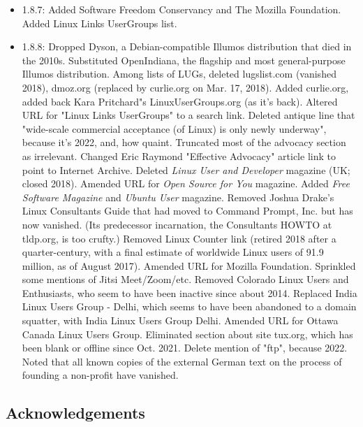 \begin{itemize}
\item 1.8.7:  Added Software Freedom Conservancy and The Mozilla
Foundation.  Added Linux Links UserGroups list.
\item 1.8.8:  Dropped Dyson, a Debian-compatible Illumos
distribution that died in the 2010s.  Substituted OpenIndiana, the
flagship and most general-purpose Illumos distribution.  Among lists of
LUGs, deleted lugslist.com (vanished 2018), dmoz.org (replaced by
curlie.org on Mar. 17, 2018).  Added curlie.org, added back Kara Pritchard"s 
LinuxUserGroups.org (as it's back).  Altered URL for "Linux Links
UserGroups" to a search link.  Deleted antique line that "wide-scale commercial acceptance 
(of Linux) is only newly underway", because it's 2022, and, how quaint.  Truncated most 
of the advocacy section as irrelevant.  Changed Eric Raymond "Effective Advocacy" article 
link to point to Internet Archive.
Deleted {\itshape Linux User and Developer\/} magazine (UK; closed 2018). Amended URL for 
{\itshape Open Source for You\/} magazine.  Added {\itshape Free Software Magazine\/} and 
{\itshape Ubuntu User\/} magazine.  Removed 
Joshua Drake's Linux Consultants Guide that had moved to Command Prompt, Inc. but
has now vanished.  (Its predecessor incarnation, the Consultants HOWTO at tldp.org, 
is too crufty.)  Removed Linux Counter link (retired 2018 after a quarter-century, 
with a final estimate of worldwide Linux users of 91.9 million, as of August 2017).
Amended URL for Mozilla Foundation.  Sprinkled some mentions of Jitsi Meet/Zoom/etc.
Removed Colorado Linux Users and Enthusiasts, who seem to have been inactive since 
about 2014.  Replaced India Linux Users Group - Delhi, which seems to have been abandoned 
to a domain squatter, with India Linux Users Group Delhi.  Amended URL for Ottawa 
Canada Linux Users Group.  Eliminated section about site tux.org, which has been blank
or offline since Oct. 2021.  Delete mention of "ftp", because 2022.  Noted that 
all known copies of the external German text on the process of founding a non-profit have 
vanished.
\end{itemize}









\subsection{Acknowledgements}



